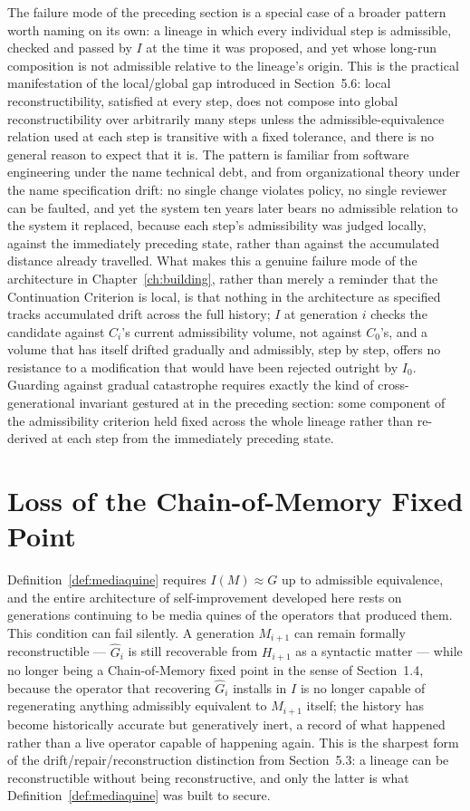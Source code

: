 \documentclass[11pt]{book}
\begin{document}
The failure mode of the preceding section is a special case of a broader pattern worth naming on its own: a lineage in which every individual step is admissible, checked and passed by $I$ at the time it was proposed, and yet whose long-run composition is not admissible relative to the lineage's origin. This is the practical manifestation of the local/global gap introduced in Section~5.6: local reconstructibility, satisfied at every step, does not compose into global reconstructibility over arbitrarily many steps unless the admissible-equivalence relation used at each step is transitive with a fixed tolerance, and there is no general reason to expect that it is. The pattern is familiar from software engineering under the name technical debt, and from organizational theory under the name specification drift: no single change violates policy, no single reviewer can be faulted, and yet the system ten years later bears no admissible relation to the system it replaced, because each step's admissibility was judged locally, against the immediately preceding state, rather than against the accumulated distance already travelled. What makes this a genuine failure mode of the architecture in Chapter~\ref{ch:building}, rather than merely a reminder that the Continuation Criterion is local, is that nothing in the architecture as specified tracks accumulated drift across the full history; $I$ at generation $i$ checks the candidate against $C_i$'s current admissibility volume, not against $C_0$'s, and a volume that has itself drifted gradually and admissibly, step by step, offers no resistance to a modification that would have been rejected outright by $I_0$. Guarding against gradual catastrophe requires exactly the kind of cross-generational invariant gestured at in the preceding section: some component of the admissibility criterion held fixed across the whole lineage rather than re-derived at each step from the immediately preceding state.

\section{Loss of the Chain-of-Memory Fixed Point}

Definition~\ref{def:mediaquine} requires $I(M) \approx G$ up to admissible equivalence, and the entire architecture of self-improvement developed here rests on generations continuing to be media quines of the operators that produced them. This condition can fail silently. A generation $M_{i+1}$ can remain formally reconstructible --- $\widehat{G}_i$ is still recoverable from $H_{i+1}$ as a syntactic matter --- while no longer being a Chain-of-Memory fixed point in the sense of Section~1.4, because the operator that recovering $\widehat{G}_i$ installs in $I$ is no longer capable of regenerating anything admissibly equivalent to $M_{i+1}$ itself; the history has become historically accurate but generatively inert, a record of what happened rather than a live operator capable of happening again. This is the sharpest form of the drift/repair/reconstruction distinction from Section~5.3: a lineage can be reconstructible without being reconstructive, and only the latter is what Definition~\ref{def:mediaquine} was built to secure.
\end{document}
